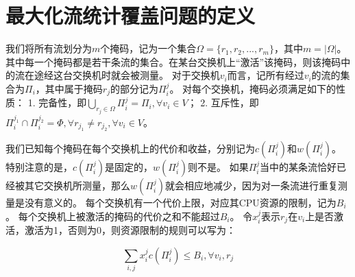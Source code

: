 






\section{最大化流统计覆盖问题的定义}\label{sec:mscdef}
我们将所有流划分为$m$个掩码，记为一个集合$\Omega=\{r_1,r_2,...,r_m\}$，其中$m = |\Omega|$。
其中每一个掩码都是若干条流的集合。在某台交换机上“激活”该掩码，则该掩码中的流在途经这台交换机时就会被测量。
对于交换机$v_i$而言，记所有经过$v_i$的流的集合为$\Pi_i$，其中属于掩码$r_j$的部分记为$\Pi^j_i$。
对每个交换机，掩码必须满足如下的性质：
1. 完备性，即$\bigcup\nolimits_{r_j \in \Omega} \Pi^j_i = \Pi_i, \forall v_i \in V$；
2. 互斥性，即$\Pi^{j_1}_i \cap \Pi^{j_2}_i = \Phi, \forall r_{j_1} \neq r_{j_2}, \forall v_i \in V$。

我们已知每个掩码在每个交换机上的代价和收益，分别记为$c(\Pi^j_i)$和$w(\Pi^j_i)$。
特别注意的是，$c(\Pi^j_i)$是固定的，$w(\Pi^j_i)$则不是。
如果$\Pi^j_i$当中的某条流恰好已经被其它交换机所测量，那么$w(\Pi^j_i)$就会相应地减少，因为对一条流进行重复测量是没有意义的。
每个交换机有一个代价上限，对应其CPU资源的限制，记为$B_i$。
每个交换机上被激活的掩码的代价之和不能超过$B_i$。
令$x_i^j$表示$r_j$在$v_i$上是否激活，激活为1，否则为0，则资源限制的规则可以写为：

\begin{equation}
    \sum_{i,j} x_i^j c(\Pi^j_i) \le B_i, \forall v_i,r_j   
\end{equation}

